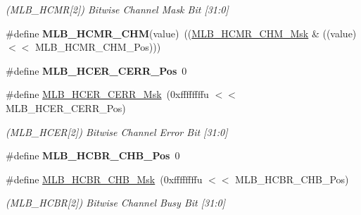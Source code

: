 \begin{DoxyCompactItemize}
\begin{DoxyCompactList}\small\item\em (M\+L\+B\+\_\+\+H\+C\+MR\mbox{[}2\mbox{]}) Bitwise Channel Mask Bit \mbox{[}31\+:0\mbox{]} \end{DoxyCompactList}\item 
\mbox{\label{group__SAMV71__MLB_gac0a14de295cb308d37459a059bbb1773}} 
\#define {\bfseries M\+L\+B\+\_\+\+H\+C\+M\+R\+\_\+\+C\+HM}(value)~((\mbox{\hyperlink{group__SAMV71__MLB_gaa4141285a366c4935b289a394441f705}{M\+L\+B\+\_\+\+H\+C\+M\+R\+\_\+\+C\+H\+M\+\_\+\+Msk}} \& ((value) $<$$<$ M\+L\+B\+\_\+\+H\+C\+M\+R\+\_\+\+C\+H\+M\+\_\+\+Pos)))
\item 
\mbox{\label{group__SAMV71__MLB_ga7d898c5eb4e5465345dccd3bab8176d6}} 
\#define {\bfseries M\+L\+B\+\_\+\+H\+C\+E\+R\+\_\+\+C\+E\+R\+R\+\_\+\+Pos}~0
\item 
\mbox{\label{group__SAMV71__MLB_gacb61674f009b3320b8e8c4c7ca115c0b}} 
\#define \mbox{\hyperlink{group__SAMV71__MLB_gacb61674f009b3320b8e8c4c7ca115c0b}{M\+L\+B\+\_\+\+H\+C\+E\+R\+\_\+\+C\+E\+R\+R\+\_\+\+Msk}}~(0xffffffffu $<$$<$ M\+L\+B\+\_\+\+H\+C\+E\+R\+\_\+\+C\+E\+R\+R\+\_\+\+Pos)
\begin{DoxyCompactList}\small\item\em (M\+L\+B\+\_\+\+H\+C\+ER\mbox{[}2\mbox{]}) Bitwise Channel Error Bit \mbox{[}31\+:0\mbox{]} \end{DoxyCompactList}\item 
\mbox{\label{group__SAMV71__MLB_ga5b1364eda306876b8b5186764adab03d}} 
\#define {\bfseries M\+L\+B\+\_\+\+H\+C\+B\+R\+\_\+\+C\+H\+B\+\_\+\+Pos}~0
\item 
\mbox{\label{group__SAMV71__MLB_gaba74c631ac7459b528a6160a86cb1261}} 
\#define \mbox{\hyperlink{group__SAMV71__MLB_gaba74c631ac7459b528a6160a86cb1261}{M\+L\+B\+\_\+\+H\+C\+B\+R\+\_\+\+C\+H\+B\+\_\+\+Msk}}~(0xffffffffu $<$$<$ M\+L\+B\+\_\+\+H\+C\+B\+R\+\_\+\+C\+H\+B\+\_\+\+Pos)
\begin{DoxyCompactList}\small\item\em (M\+L\+B\+\_\+\+H\+C\+BR\mbox{[}2\mbox{]}) Bitwise Channel Busy Bit \mbox{[}31\+:0\mbox{]} \end{DoxyCompactList}\item 
$$
\end{DoxyCompactItemize}
